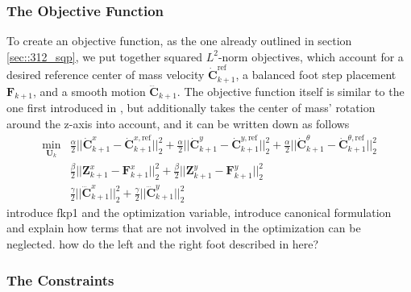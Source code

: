 \subsubsection{The Objective Function}
To create an objective function, as the one already outlined in section \ref{sec::312_sqp}, we put together squared $L^2$-norm objectives, which account for a desired reference center of mass velocity $\dot{\bm{C}}_{k+1}^\text{ref}$, a balanced foot step placement $\textbf{F}_{k+1}$, and a smooth motion $\dddot{\bm{C}}_{k+1}$. The objective function itself is similar to the one first introduced in \cite{herdt2010online}, but additionally takes the center of mass' rotation around the z-axis into account, and it can be written down as follows
\begin{align}
	\min_{\bm{U}_k} &\frac{\alpha}{2}||\dot{\bm{C}}^x_{k+1} - \dot{\bm{C}}_{k+1}^{x,\text{ref}}||_2^2 + \frac{\alpha}{2}||\dot{\bm{C}}^y_{k+1} - \dot{\bm{C}}_{k+1}^{y,\text{ref}}||_2^2 + \frac{\alpha}{2}||\dot{\bm{C}}^\theta_{k+1} - \dot{\bm{C}}_{k+1}^{\theta,\text{ref}}||_2^2 \\
	&\frac{\beta}{2}||\bm{Z}^x_{k+1}-\bm{F}^x_{k+1}||^2_2 + \frac{\beta}{2}||\bm{Z}^y_{k+1}-\bm{F}^y_{k+1}||^2_2 \\
	&\frac{\gamma}{2}||\dddot{\bm{C}}_{k+1}^x||^2_2 + \frac{\gamma}{2}||\dddot{\bm{C}}_{k+1}^y||^2_2	
\end{align}
introduce fkp1 and the optimization variable, introduce canonical formulation and explain how terms that are not involved in the optimization can be neglected. how do the left and the right foot described in here?
\cite{herdt2010walking} %
\subsubsection{The Constraints}
\cite{naveau2016reactive} %
\subsubsection{}